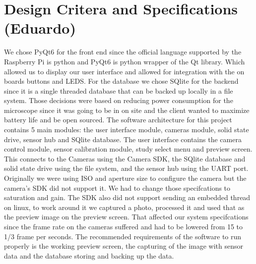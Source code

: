 \section{Design Critera and Specifications (Eduardo)}
We chose PyQt6 for the front end since the official language supported by the Raspberry Pi is python and PyQt6 is python wrapper of the Qt library. Which allowed us to display our user interface and allowed for integration with the on boards buttons and LEDS. For the database we chose SQlite for the backend since it is a single threaded database that can be backed up locally in a file system. Those decisions were based on reducing power consumption for the microscope since it was going to be in on site and the client wanted to maximize battery life and be open sourced. The software architecture for this project contains 5 main modules: the user interface module, cameras module, solid state drive, sensor hub and SQlite database. The user interface contains the camera control module, sensor calibration module, study select menu and preview screen. This connects to the Cameras using the Camera SDK, the SQlite database and solid state drive using the file system, and the sensor hub using the UART port. Originally we were using ISO and aperture size to configure the camera but the camera's SDK did not support it. We had to change those specifcations to saturation and gain. The SDK also did not support sending an embedded thread on linux, to work around it we captured a photo, processed it and used that as the preview image on the preview screen. That affected our system specifcations since the frame rate on the cameras suffered and had to be lowered from 15 to 1/3 frame per seconds. The recommended requirements of the software to run properly is the working preview screen, the capturing of the image with sensor data and the database storing and backing up the data.